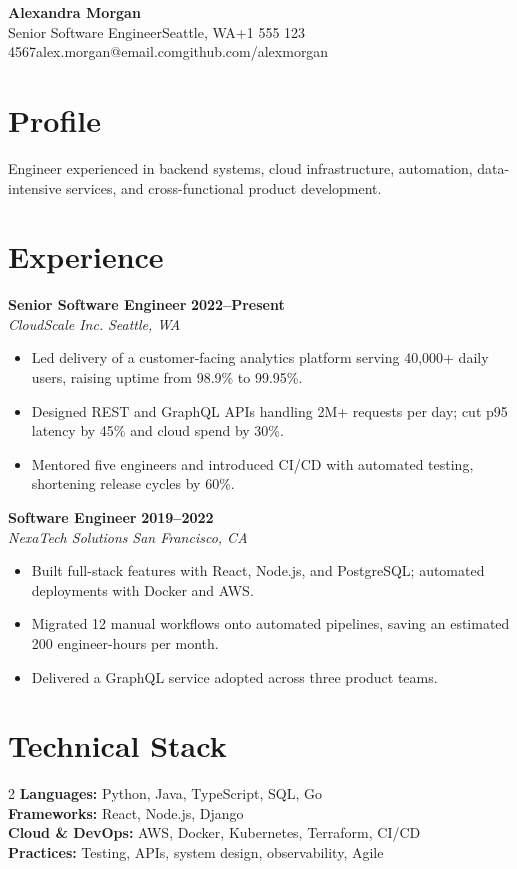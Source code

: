 \documentclass[10pt,letterpaper]{article}
\begin{document}
\begin{center}\textbf{\LARGE Alexandra Morgan}\\[3pt]
\small Senior Software Engineer\textbar{}Seattle, WA\textbar{}+1 555 123 4567\textbar{}alex.morgan@email.com\textbar{}github.com/alexmorgan\end{center}

\section{Profile}
\noindent Engineer experienced in backend systems, cloud infrastructure, automation, data-intensive services, and cross-functional product development.

\section{Experience}
\noindent\textbf{Senior Software Engineer} \hfill \textbf{2022--Present}\\
\textit{CloudScale Inc.} \hfill \textit{Seattle, WA}\\[2pt]
\begin{itemize}
\item Led delivery of a customer-facing analytics platform serving 40,000+ daily users, raising uptime from 98.9\% to 99.95\%.
\item Designed REST and GraphQL APIs handling 2M+ requests per day; cut p95 latency by 45\% and cloud spend by 30\%.
\item Mentored five engineers and introduced CI/CD with automated testing, shortening release cycles by 60\%.
\end{itemize}
\vspace{5pt}
\noindent\textbf{Software Engineer} \hfill \textbf{2019--2022}\\
\textit{NexaTech Solutions} \hfill \textit{San Francisco, CA}\\[2pt]
\begin{itemize}
\item Built full-stack features with React, Node.js, and PostgreSQL; automated deployments with Docker and AWS.
\item Migrated 12 manual workflows onto automated pipelines, saving an estimated 200 engineer-hours per month.
\item Delivered a GraphQL service adopted across three product teams.
\end{itemize}
\vspace{5pt}
\section{Technical Stack}
\begin{multicols}{2}
\noindent \textbf{Languages:} Python, Java, TypeScript, SQL, Go\\[2pt] \textbf{Frameworks:} React, Node.js, Django\\[2pt] \textbf{Cloud \& DevOps:} AWS, Docker, Kubernetes, Terraform, CI/CD\\[2pt] \textbf{Practices:} Testing, APIs, system design, observability, Agile
\end{multicols}
\end{document}
